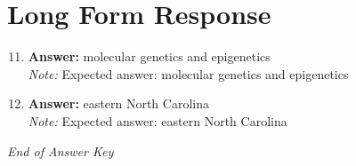 \documentclass[12pt]{article}
\begin{document}
\section*{Long Form Response}
\begin{enumerate}[label=\arabic*.]
\setcounter{enumi}{10}
\item \textbf{Answer:} molecular genetics and epigenetics
\\ \textit{Note:} Expected answer: molecular genetics and epigenetics
\item \textbf{Answer:} eastern North Carolina
\\ \textit{Note:} Expected answer: eastern North Carolina
\end{enumerate}

\vfill
\noindent\textit{End of Answer Key}
\end{document}
